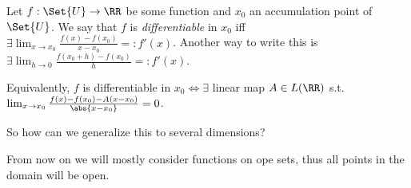 \begin{defn}
 Let $f:\Set{U}\to\RR$ be some function and $x_0$ an accumulation point of $\Set{U}$. We say that $f$ is \emph{differentiable} in $x_0$ iff $\exists \lim_{x\to x_0} \frac{f(x)-f(x_0)}{x-x_0}=:f'(x)$. Another way to write this is $\exists \lim_{h\to 0}\frac{f(x_0+h)-f(x_0)}{h}=:f'(x)$. 
\end{defn}
\begin{rem}
 Equivalently, $f$ is differentiable in $x_0\Leftrightarrow \exists$ linear map $A\in L(\RR)$ s.t. $\lim_{x\to x_0}\frac{f(x)-f(x_0)-A(x-x_0)}{\abs{x-x_0}}=0$.
\end{rem}
So how can we generalize this to several dimensions?
\begin{rem}
 From now on we will mostly consider functions on ope sets, thus all points in the domain will be open. 
\end{rem}

